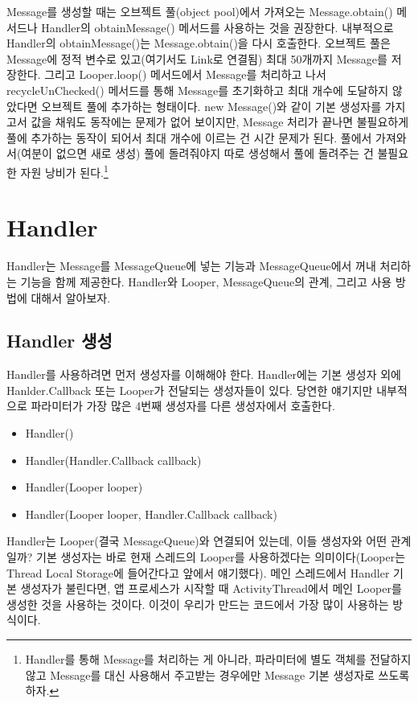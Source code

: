 Message를 생성할 때는 오브젝트 풀(object pool)에서 가져오는 Message.obtain() 메서드나 Handler의 obtainMessage() 메서드를 사용하는 것을 권장한다. 내부적으로 Handler의 obtainMessage()는  Message.obtain()을 다시 호출한다.
오브젝트 풀은 Message에 정적 변수로 있고(여기서도 Link로 연결됨) 최대 50개까지 Message를 저장한다. 그리고 Looper.loop() 메서드에서 Message를 처리하고 나서 recycleUnChecked() 메서드를 통해 Message를 초기화하고 최대 개수에 도달하지 않았다면 오브젝트 풀에 추가하는 형태이다.
new Message()와 같이 기본 생성자를 가지고서 값을 채워도 동작에는 문제가 없어 보이지만, Message 처리가 끝나면 불필요하게 풀에 추가하는 동작이 되어서 최대 개수에 이르는 건 시간 문제가 된다. 
풀에서 가져와서(여분이 없으면 새로 생성) 풀에 돌려줘야지 따로 생성해서 풀에 돌려주는 건 불필요한 자원 낭비가 된다.\footnote{Handler를 통해 Message를 처리하는 게 아니라, 파라미터에 별도 객체를 전달하지 않고 Message를 대신 사용해서 주고받는 경우에만 Message 기본 생성자로 쓰도록 하자.}\\


\section{Handler}
Handler는 Message를 MessageQueue에 넣는 기능과 MessageQueue에서 꺼내 처리하는 기능을 함께 제공한다. Handler와 Looper, MessageQueue의 관계, 그리고 사용 방법에 대해서 알아보자.

\subsection{Handler 생성}
Handler를 사용하려면 먼저 생성자를 이해해야 한다. 
Handler에는 기본 생성자 외에 Hanlder.Callback 또는 Looper가 전달되는 생성자들이 있다. 
당연한 얘기지만 내부적으로 파라미터가 가장 많은 4번째 생성자를 다른 생성자에서 호출한다.
\begin{itemize}
\item Handler()
\item Handler(Handler.Callback callback)
\item Handler(Looper looper)
\item Handler(Looper looper, Handler.Callback callback)
\end{itemize}

Handler는 Looper(결국 MessageQueue)와 연결되어 있는데, 이들 생성자와 어떤 관계일까? 기본 생성자는 바로 현재 스레드의 Looper를 사용하겠다는 의미이다(Looper는 Thread Local Storage에 들어간다고 앞에서 얘기했다).
메인 스레드에서 Handler 기본 생성자가 불린다면, 앱 프로세스가 시작할 때 ActivityThread에서 메인 Looper를 생성한 것을 사용하는 것이다. 이것이 우리가 만드는 코드에서 가장 많이 사용하는 방식이다.\\

